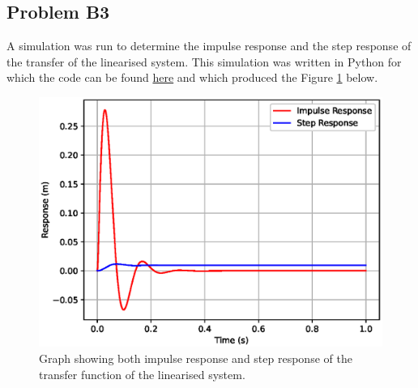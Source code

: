 \subsection*{Problem B3}
    \hfill \break
    A simulation was run to determine the impulse response and the step response of the transfer of the linearised system. This simulation was written in Python for which the code can be found \href{https://github.com/drlim2u/ELE2024-Control-Coursework/blob/059953dc7b2d8ba0a86b6f437153ceb4442b7a60/PartB.py#L59}{here} and which produced the Figure \ref{fig:problem_b3} below.
    \begin{figure}[H]
        \centering
        \includegraphics[width=0.6\linewidth]{figures/problem_b3.eps}
        \caption{Graph showing both impulse response and step response of the transfer function of the linearised system.}
        \label{fig:problem_b3}
    \end{figure}

  